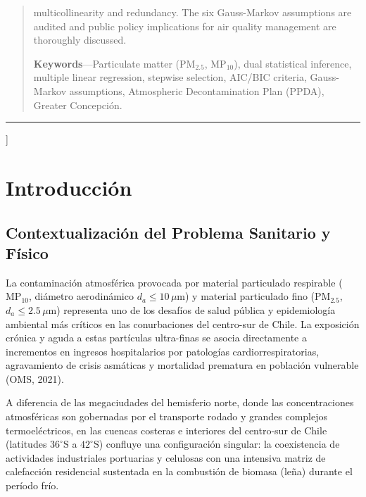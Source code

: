\documentclass[10pt,twocolumn,a4paper]{article}
\begin{document}
{\begin{quotation}
multicollinearity and redundancy. The six Gauss-Markov assumptions are audited and public policy implications for air quality management are thoroughly discussed.\par
    \vspace{0.12cm}
    \textbf{\color{navyblue}Keywords}---Particulate matter ($\text{PM}_{2.5}$, $\text{MP}_{10}$), dual statistical inference, multiple linear regression, stepwise selection, AIC/BIC criteria, Gauss-Markov assumptions, Atmospheric Decontamination Plan (PPDA), Greater Concepción.
  \end{quotation}
  \vspace{0.20cm}
  \hrule
  \vspace{0.35cm}
}]

\section{Introducción}

\subsection{Contextualización del Problema Sanitario y Físico}
La contaminación atmosférica provocada por material particulado respirable ($\text{MP}_{10}$, diámetro aerodinámico $d_a \le 10\,\mu\text{m}$) y material particulado fino ($\text{PM}_{2.5}$, $d_a \le 2.5\,\mu\text{m}$) representa uno de los desafíos de salud pública y epidemiología ambiental más críticos en las conurbaciones del centro-sur de Chile. La exposición crónica y aguda a estas partículas ultra-finas se asocia directamente a incrementos en ingresos hospitalarios por patologías cardiorrespiratorias, agravamiento de crisis asmáticas y mortalidad prematura en población vulnerable (OMS, 2021). 

A diferencia de las megaciudades del hemisferio norte, donde las concentraciones atmosféricas son gobernadas por el transporte rodado y grandes complejos termoeléctricos, en las cuencas costeras e interiores del centro-sur de Chile (latitudes $36^\circ\text{S}$ a $42^\circ\text{S}$) confluye una configuración singular: la coexistencia de actividades industriales portuarias y celulosas con una intensiva matriz de calefacción residencial sustentada en la combustión de biomasa (leña) durante el período frío.
\end{document}
